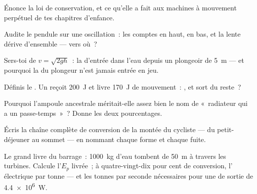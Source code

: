 \begin{exercise}[$\star$]\label{exo:g9:energy-conversions:3}
Énonce la loi de conservation, et ce qu'elle a fait aux machines à
mouvement perpétuel de tes chapitres d'enfance.
\end{exercise}

\begin{exercise}[$\star$]\label{exo:g9:energy-conversions:4}
Audite le pendule sur une oscillation~: les comptes en haut, en bas,
et la lente dérive d'ensemble --- vers où~?
\end{exercise}

\begin{exercise}[$\star$]\label{exo:g9:energy-conversions:5}
Sers-toi de $v = \sqrt{2 g h}$~: la  d'entrée dans l'eau depuis
un plongeoir de \qty{5}{m} --- et pourquoi la  du plongeur n'est
jamais entrée en jeu.
\end{exercise}

\begin{exercise}[$\star$]\label{exo:g9:energy-conversions:6}
Définis le . Un  reçoit \qty{200}{J} et livre
\qty{170}{J} de mouvement~: , et sort du reste~?
\end{exercise}

\begin{exercise}[$\star$]\label{exo:g9:energy-conversions:7}
Pourquoi l'ampoule ancestrale méritait-elle assez bien le nom de
«~radiateur qui a un passe-temps~»~? Donne les deux pourcentages.
\end{exercise}

\begin{exercise}[$\star$]\label{exo:g9:energy-conversions:8}
Écris la chaîne complète de conversion de la montée du cycliste ---
du petit-déjeuner au sommet --- en nommant chaque forme et chaque
fuite.
\end{exercise}

\begin{exercise}[$\star\star$]\label{exo:g9:energy-conversions:9}
Le grand livre du barrage~: \qty{1000}{kg} d'eau tombent de
\qty{50}{m} à travers les turbines. Calcule l'$E_p$ livrée~; à
quatre-vingt-dix pour cent de conversion, l' électrique par
tonne --- et les tonnes par seconde nécessaires pour une  de
sortie de \qty{4.4e6}{W}.
\end{exercise}

